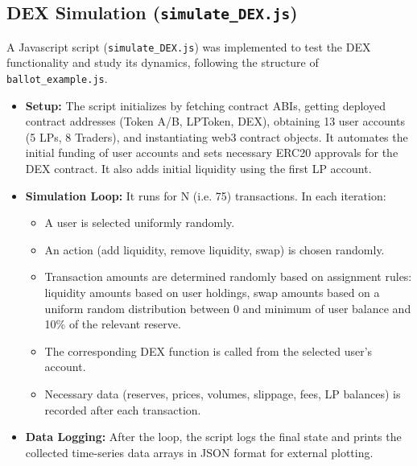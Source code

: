 \documentclass[12pt]{article}
\begin{document}
\subsection{DEX Simulation (\texttt{simulate\_DEX.js})}
A Javascript script (\texttt{simulate\_DEX.js}) was implemented to test the DEX functionality and study its dynamics, following the structure of \texttt{ballot\_example.js}.
\begin{itemize}
    \item \textbf{Setup:} The script initializes by fetching contract ABIs, getting deployed contract addresses (Token A/B, LPToken, DEX), obtaining 13 user accounts (5 LPs, 8 Traders), and instantiating web3 contract objects. It automates the initial funding of user accounts and sets necessary ERC20 approvals for the DEX contract. It also adds initial liquidity using the first LP account.
    \item \textbf{Simulation Loop:} It runs for N (i.e. 75) transactions. In each iteration:
          \begin{itemize}
              \item A user is selected uniformly randomly.
              \item An action (add liquidity, remove liquidity, swap) is chosen randomly.
              \item Transaction amounts are determined randomly based on assignment rules: liquidity amounts based on user holdings, swap amounts based on a uniform random distribution between 0 and minimum of user balance and 10\% of the relevant reserve.
              \item The corresponding DEX function is called from the selected user's account.
              \item Necessary data (reserves, prices, volumes, slippage, fees, LP balances) is recorded after each transaction.
          \end{itemize}
    \item \textbf{Data Logging:} After the loop, the script logs the final state and prints the collected time-series data arrays in JSON format for external plotting.
\end{itemize}
\end{document}
